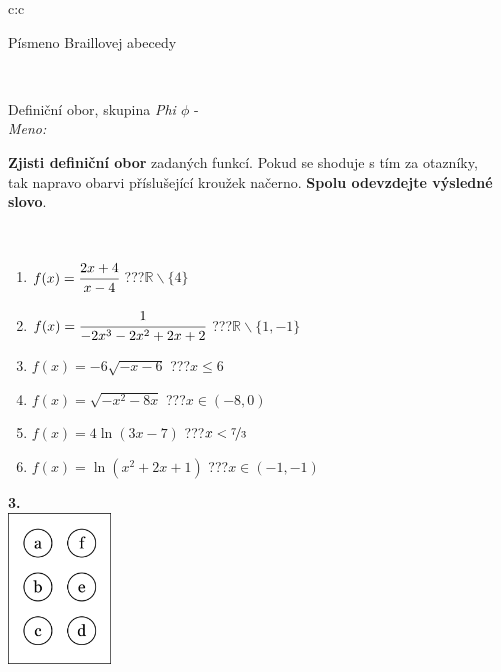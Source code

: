 \documentclass[10pt]{report}
\begin{document}
\begin{tabular}{c:c}
\begin{minipage}[c][104.5mm][t]{0.5\linewidth}
\begin{center}
\begin{minipage}{0.20\linewidth}
\begin{center}
{\small Písmeno Braillovej abecedy}
\end{center}
\end{minipage}
\end{center}
\end{minipage}
\\ \hdashline
\begin{minipage}[c][104.5mm][t]{0.5\linewidth}
\begin{center}
\vspace{7mm}
{\huge Definiční obor, skupina \textit{Phi $\phi$} -}\\[5mm]
\textit{Meno:}\phantom{xxxxxxxxxxxxxxxxxxxxxxxxxxxxxxxxxxxxxxxxxxxxxxxxxxxxxxxxxxxxxxxxx}\\[5mm]
\begin{minipage}{0.95\linewidth}
\textbf{Zjisti definiční obor} zadaných funkcí. Pokud se shoduje s tím za otazníky,\\tak napravo obarvi příslušející kroužek načerno. \textbf{Spolu odevzdejte výsledné slovo}.
\end{minipage}
\\[1mm]
\begin{minipage}{0.79\linewidth}
\begin{center}
\begin{varwidth}{\linewidth}
\begin{enumerate}
\normalsizerrr
\item $f(x)=\cfrac{2x+4}{x-4}$\quad \dotfill\; ???\;\dotfill \quad $\mathbb{R}\smallsetminus\{4\}$
\item $f(x)=\cfrac{1}{-2x^3-2x^2+2x+2}$\quad \dotfill\; ???\;\dotfill \quad $\mathbb{R}\smallsetminus\{1,-1\}$
\item $f(x)=-6\sqrt{-x-6}$\quad \dotfill\; ???\;\dotfill \quad $x\leq6$
\item $f(x)=\sqrt{-x^2-8x}$\quad \dotfill\; ???\;\dotfill \quad $x\in(-8 , 0)$
\item $f(x)=4\ln{(3x-7)}$\quad \dotfill\; ???\;\dotfill \quad $x<\nicefrac{7}{3}$
\item $f(x)=\ln{(x^2+2x+1)}$\quad \dotfill\; ???\;\dotfill \quad $x\in(-1 , -1)$
\end{enumerate}
\end{varwidth}
\end{center}
\end{minipage}
\begin{minipage}{0.20\linewidth}
\begin{center}
{\Huge\bfseries 3.} \\[2mm]
\includegraphics[height=40mm]{../images/braille.png}

\end{center}
\end{minipage}
\end{center}
\end{minipage}
\end{tabular}
\end{document}
